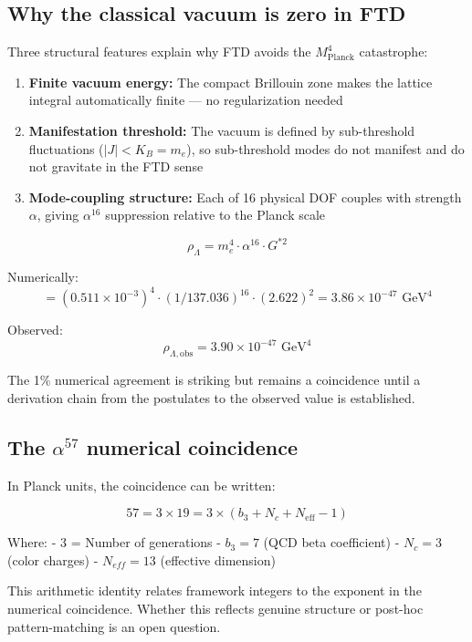 \documentclass[
  11pt,
  letterpaper,
  twoside,
  openright]{book}
\providecommand{\tightlist}{%
  \setlength{\itemsep}{0pt}\setlength{\parskip}{0pt}}
\begin{document}
\subsection{Why the classical vacuum is zero in
FTD}\label{why-the-classical-vacuum-is-zero-in-ftd}

Three structural features explain why FTD avoids the
\(M_\text{Planck}^4\) catastrophe:

\begin{enumerate}
\def\labelenumi{\arabic{enumi}.}
\tightlist
\item
  \textbf{Finite vacuum energy:} The compact Brillouin zone makes the
  lattice integral automatically finite --- no regularization needed
\item
  \textbf{Manifestation threshold:} The vacuum is defined by
  sub-threshold fluctuations (\(|J| < K_B = m_e\)), so sub-threshold
  modes do not manifest and do not gravitate in the FTD sense
\item
  \textbf{Mode-coupling structure:} Each of 16 physical DOF couples with
  strength \(\alpha\), giving \(\alpha^{16}\) suppression relative to
  the Planck scale
\end{enumerate}

\[\rho_\Lambda = m_e^4 \cdot \alpha^{16} \cdot G^{*2}\]

Numerically:
\[= (0.511 \times 10^{-3})^4 \cdot (1/137.036)^{16} \cdot (2.622)^2 = 3.86 \times 10^{-47} \text{ GeV}^4\]

Observed:
\[\rho_{\Lambda,\text{obs}} = 3.90 \times 10^{-47} \text{ GeV}^4\]

The 1\% numerical agreement is striking but remains a coincidence until
a derivation chain from the postulates to the observed value is
established.

\subsection{\texorpdfstring{The \(\alpha^{57}\) numerical
coincidence}{The \textbackslash alpha\^{}\{57\} numerical coincidence}}\label{the-alpha57-numerical-coincidence}

In Planck units, the coincidence can be written:

\[57 = 3 \times 19 = 3 \times (b_3 + N_c + N_{\text{eff}} - 1)\]

Where: - 3 = Number of generations - \(b_3 = 7\) (QCD beta coefficient)
- \(N_c = 3\) (color charges) - \(N_{eff} = 13\) (effective dimension)

This arithmetic identity relates framework integers to the exponent in
the numerical coincidence. Whether this reflects genuine structure or
post-hoc pattern-matching is an open question.
\end{document}
